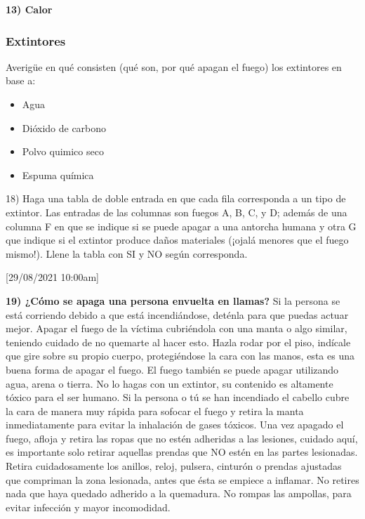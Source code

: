 \documentclass[letterpaper,11pt]{article}
\begin{document}
\textbf{13) Calor}


\subsubsection{Extintores}

Averigüe en qué consisten (qué son, por qué apagan el fuego) los extintores en base a:
\begin{itemize}
    \item Agua
    \item Dióxido de carbono
    \item Polvo quimico seco
    \item Espuma química
\end{itemize}

18) Haga una tabla de doble entrada en que cada fila corresponda a un tipo de extintor.
Las entradas de las columnas son fuegos A, B, C, y D; además de una columna F en que se indique si se puede apagar a una antorcha humana y otra G que indique si el extintor produce daños materiales (¡ojalá menores que el fuego mismo!). Llene la tabla con SI y NO según corresponda.

[29/08/2021 10:00am]

\textbf{19) ¿Cómo se apaga una persona envuelta en llamas?}
Si la persona se está corriendo debido a que está incendiándose, deténla para que puedas actuar mejor.
Apagar el fuego de la víctima cubriéndola con una manta o algo similar, teniendo cuidado de no quemarte al hacer esto.
Hazla rodar por el piso, indícale que gire sobre su propio cuerpo, protegiéndose la cara con las manos, esta es una buena forma de apagar el fuego.
El fuego también se puede apagar utilizando agua, arena o tierra. No lo hagas con un extintor, su contenido es altamente tóxico para el ser humano.
Si la persona o tú se han incendiado el cabello cubre la cara de manera muy rápida para sofocar el fuego y retira la manta inmediatamente para evitar la inhalación de gases tóxicos.
Una vez apagado el fuego, afloja y retira las ropas que no estén adheridas a las lesiones, cuidado aquí, es importante solo retirar aquellas prendas que NO estén en las partes lesionadas.
Retira cuidadosamente los anillos, reloj, pulsera, cinturón o prendas ajustadas que compriman la zona lesionada, antes que ésta se empiece a inflamar. No retires nada que haya quedado adherido a la quemadura. No rompas las ampollas, para evitar infección y mayor incomodidad.
\end{document}
